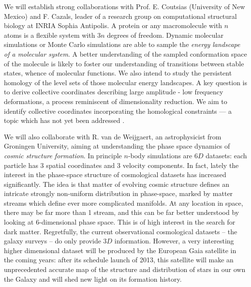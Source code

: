 
We will establish strong collaborations with Prof. E. Coutsias (University
of New Mexico) and 
F. Cazals, leader of a
research group on computational structural biology at INRIA Sophia
Antipolis. A protein or any macromolecule with $n$ atoms is a flexible
system with $3n$ degrees of freedom. Dynamic molecular
simulations or Monte Carlo simulations are able to sample the {\em energy
landscape of a molecular system}. A better understanding of the
sampled conformation space of the molecule is likely to
foster our understanding of transitions between stable states,
whence of molecular functions.
We also intend to study the persistent homology
of the level sets of those molecular energy landscapes. A key question
 is to derive collective coordinates describing large amplitude -
low frequency deformations, a process reminiscent of dimensionality
reduction. We aim to identify collective coordinates incorporating
the homological constraints --- a topic which has not yet been
addressed \cite{djw-el-2003}. 

We will also collaborate with R. van de Weijgaert, an astrophysicist from
Groningen University, aiming at understanding the  phase space dynamics of
{\em cosmic structure formation}. In principle $n$-body simulations are
$6D$ datasets: each particle has 3 spatial coordinates and 3 velocity components.
In fact, lately the interest in the phase-space structure
of cosmological datasets has increased significantly. The idea is that matter of evolving cosmic
structure defines an intricate strongly non-uniform distribution in phase-space,
marked by matter streams which define ever more complicated
manifolds. At any location in space, there may be far more than 1 stream, and this
can be far better understood by looking at $6$-dimensional phase space. This is of high
interest in the search for dark matter. Regretfully, the current observational
cosmological datasets -- the galaxy surveys -- do only provide $3D$ information.
However, a very interesting higher dimensional dataset will be produced by
the European Gaia satellite in the coming years: after its schedule launch of 2013, this satellite
will make an unprecedented accurate map of the structure and distribution of
stars in our own the Galaxy and will shed new light on its formation
history. 

